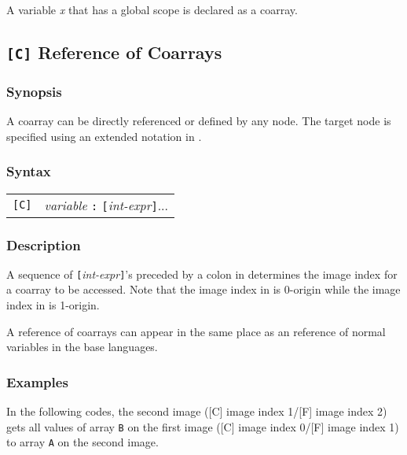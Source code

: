 A variable {\it x} that has a global scope is declared as a coarray.

\subsection{{\tt [C]} Reference of Coarrays}

\subsubsection*{Synopsis}
A coarray can be directly referenced or defined by any node. 
The target node is specified using an extended notation in {\XMPC}.

\subsubsection*{Syntax}

\begin{tabular}{ll}
\verb![C]! & {\it variable} {\tt :} {\tt [}{\it int-expr}{\tt ]}...\\
\end{tabular}

\subsubsection*{Description}

A sequence of {\tt [}{\it int-expr}{\tt ]}'s preceded by a colon in
{\XMPC} determines the image index for a coarray to be accessed.
Note that the image index in {\XMPC} is 0-origin while the image index in {\XMPF} is 1-origin.

A reference of coarrays can appear in the same place as an reference of
normal variables in the base languages.

\subsubsection*{Examples}

In the following codes, 
the second image ([C] image index 1/[F] image index 2) gets all values of array {\tt B} 
on the first image ([C] image index 0/[F] image index 1) to array {\tt A} on the second image.
\vspace{0.3cm}

